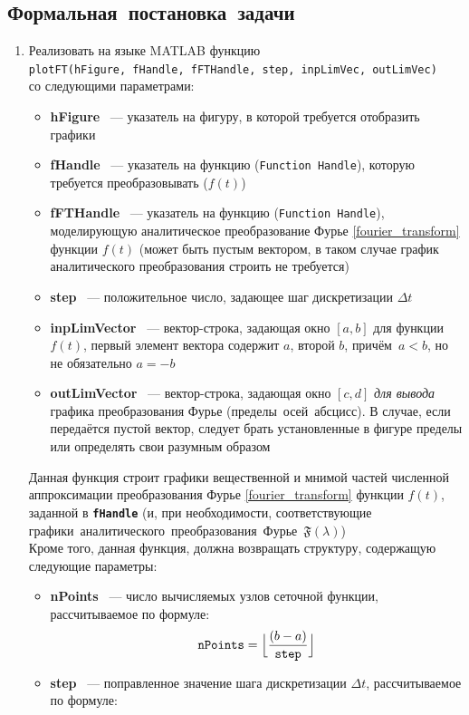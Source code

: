 \documentclass[11pt, oneside, final]{article}
\numberwithin{equation}{section}
\newcommand \bitem[1][]{
\item \textbf{#1}}
\newcommand \four[1][\lambda]{\mathfrak{F}(#1)}
\begin{document}
    \subsection{Формальная~постановка~задачи} 
    \begin{enumerate}
        \item Реализовать на языке MATLAB функцию \\\texttt{plotFT(hFigure,~fHandle,~fFTHandle,~step,~inpLimVec,~outLimVec)} \\со следующими параметрами: 
        \begin{itemize}
            \bitem[hFigure] ~--- указатель на фигуру, в которой требуется отобразить графики \bitem[fHandle] ~--- указатель на функцию (\texttt{Function Handle}), которую требуется преобразовывать (\(f(t)\)) \bitem[fFTHandle] ~--- указатель на функцию (\texttt{Function Handle}), моделирующую аналитическое преобразование Фурье \eqref{fourier_transform} функции \(f(t)\) (может быть пустым вектором, в таком случае график аналитического преобразования строить не требуется) \bitem[step] ~--- положительное число, задающее шаг дискретизации \(\Delta t\) \bitem[inpLimVector] ~--- вектор-строка, задающая окно \([a, b]\) для функции \(f(t)\), первый элемент вектора содержит \(a\), второй \(b\), причём~\(a < b\), но не обязательно \(a = -b\) \bitem[outLimVector] ~--- вектор-строка, задающая окно \([c, d]\) \textit{для вывода} графика преобразования Фурье (пределы~осей~абсцисс). В случае, если передаётся пустой вектор, следует брать установленные в фигуре пределы или определять свои разумным образом 
        \end{itemize}
        Данная функция строит графики вещественной и мнимой частей численной аппроксимации преобразования Фурье \eqref{fourier_transform} функции \(f(t)\), заданной в \textbf{\texttt{fHandle}} (и, при необходимости, соответствующие графики~аналитического~преобразования~Фурье~\(\four\)) \\
        Кроме того, данная функция, должна возвращать структуру, содержащую следующие параметры: 
        \begin{itemize}
            \bitem[nPoints] ~--- число вычисляемых узлов сеточной функции, рассчитываемое по формуле:
            \begin{equation}
            \label{eq:npoints}
                \mathtt{nPoints} = \Bigl\lfloor {\dfrac{(b - a)}{\mathtt{step}}}\Bigr\rfloor 
            \end{equation}
            \bitem[step] ~--- поправленное значение шага дискретизации \(\Delta t\), рассчитываемое по формуле:

\end{itemize}
\end{enumerate}
\end{document}
